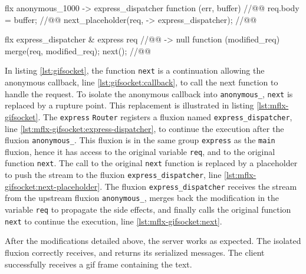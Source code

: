 \begin{code}[flx, caption={Simplified modification on the compiled result},label={lst:mflx-gifsocket}]
flx anonymous_1000
-> express_dispatcher
  function (err, buffer) { //@\label{lst:mflx-gifsocket:callback}@
    req.body = buffer; //@\label{lst:mflx-gifsocket:buffer}@
    next_placeholder(req, -> express_dispatcher); //@\label{lst:mflx-gifsocket:next-placeholder}@
  }

flx express_dispatcher & express {req} //@\label{lst:mflx-gifsocket:express-dispatcher}@
-> null
  function (modified_req) {
    merge(req, modified_req);
    next(); //@\label{lst:mflx-gifsocket:next}@
  }
\end{code}

In listing \ref{lst:gifsocket}, the function \texttt{next} is a continuation allowing the anonymous callback, line \ref{lst:gifsocket:callback}, to call the next function to handle the request.
To isolate the anonymous callback into \texttt{anonymous\_}, \texttt{next} is replaced by a rupture point.
This replacement is illustrated in listing \ref{lst:mflx-gifsocket}.
The \texttt{express} \texttt{Router} registers a fluxion named \texttt{express\_\-dispatcher}, line \ref{lst:mflx-gifsocket:express-dispatcher}, to continue the execution after the fluxion \texttt{anonymous\_}.
This fluxion is in the same group \texttt{express} as the \texttt{main} fluxion, hence it has access to the original variable \texttt{req}, and to the original function \texttt{next}.
The call to the original \texttt{next} function is replaced by a placeholder to push the stream to the fluxion \texttt{express\_\-dispatcher}, line \ref{lst:mflx-gifsocket:next-placeholder}.
The fluxion \texttt{express\_\-dispatcher} receives the stream from the upstream fluxion \texttt{anonymous\_}, merges back the modification in the variable \texttt{req} to propagate the side effects, and finally calls the original function \texttt{next} to continue the execution, line \ref{lst:mflx-gifsocket:next}.

After the modifications detailed above, the server works as expected.
The isolated fluxion correctly receives, and returns its serialized messages.
The client successfully receives a gif frame containing the text.